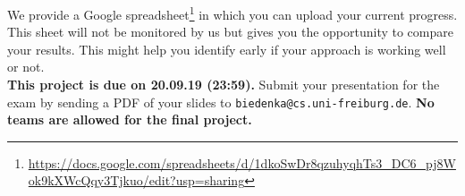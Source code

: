 \documentclass[10pt,a4paper]{article}
\newcommand{\duedate}{20.09.19 (23:59)}
\newcommand{\due}{{\bf This project is due on \duedate.} }
\begin{document}
		We provide a Google spreadsheet\footnote{\url{https://docs.google.com/spreadsheets/d/1dkoSwDr8qzuhyqhTs3_DC6_pj8Wok9kXWcQqy3Tjkuo/edit?usp=sharing}} in which you can upload your current progress. This sheet will not be monitored by us but gives you the opportunity to compare your results. This might help you identify early if your approach is working well or not.
\vspace*{\fill}\\
\noindent
\due Submit your presentation for the exam by sending a PDF of your slides to \texttt{biedenka@cs.uni-freiburg.de}. \textbf{No teams are allowed for the final project.}
\end{document}
